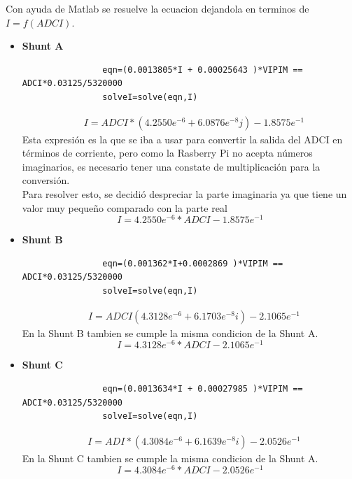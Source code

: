         Con ayuda de Matlab se resuelve la ecuacion dejandola en terminos de $I = f(ADCI) $.
        \begin{itemize}
            \item \textbf{Shunt A} 
                \begin{lstlisting}
                eqn=(0.0013805*I + 0.00025643 )*VIPIM == ADCI*0.03125/5320000
                solveI=solve(eqn,I)
                \end{lstlisting}
                \begin{align*}
                    &I = ADCI*( 4.2550e^{ -6}  + 6.0876e^{ -8 }j ) - 1.8575e^{ -1 }
                \end{align*}
                Esta expresión es la que se iba a usar para convertir la salida del ADCI en términos de corriente, pero como la Rasberry Pi no acepta números imaginarios, es necesario tener una constate de multiplicación para la conversión.
                \\
                Para resolver esto, se decidió despreciar la parte imaginaria ya que tiene un valor muy pequeño comparado con la parte real
                \begin{equation}\label{Cnt conversion ShuntA}
                    I = 4.2550e^{ -6 }*ADCI - 1.8575e^{ -1 }
                \end{equation}
            \item \textbf{Shunt B} 
                \begin{lstlisting}
                eqn=(0.001362*I+0.0002869 )*VIPIM == ADCI*0.03125/5320000
                solveI=solve(eqn,I)
                \end{lstlisting}
                \begin{align*}
                    &I = ADCI( 4.3128e^{ -6 } + 6.1703e^{ -8 }i ) - 2.1065e^{ -1 }
                \end{align*}
                En la Shunt B tambien se cumple la misma condicion de la Shunt A. 
                \begin{equation}\label{Cnt conversion ShuntB}
                    I = 4.3128e^{ -6 }*ADCI - 2.1065e^{ -1 }
                \end{equation}
            \item \textbf{Shunt C} 
                \begin{lstlisting}
                eqn=(0.0013634*I + 0.00027985 )*VIPIM == ADCI*0.03125/5320000
                solveI=solve(eqn,I)
                \end{lstlisting}
                \begin{align*}
                    &I = ADI*( 4.3084e^{ -6 } + 6.1639e^{ -8} i ) - 2.0526e^{ -1 }
                \end{align*}
                En la Shunt C tambien se cumple la misma condicion de la Shunt A. 
                \begin{equation}\label{Cnt conversion ShuntC}
                    I = 4.3084e^{ -6 }*ADCI - 2.0526e^{ -1 }
                \end{equation}
        \end{itemize}
    
